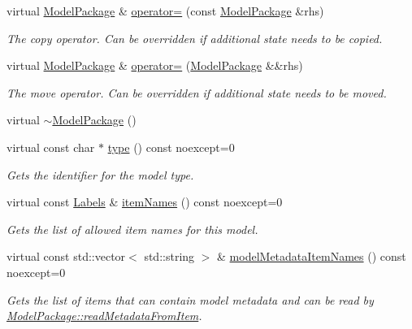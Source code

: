 \begin{DoxyCompactItemize}
\item 
virtual \hyperlink{classdg_1_1deepcore_1_1classification_1_1_model_package}{Model\+Package} \& \hyperlink{group___classification_module_gac73fbbe8aca7bc1f27507c471939a0e7}{operator=} (const \hyperlink{classdg_1_1deepcore_1_1classification_1_1_model_package}{Model\+Package} \&rhs)
\begin{DoxyCompactList}\small\item\em The copy operator. Can be overridden if additional state needs to be copied. \end{DoxyCompactList}\item 
virtual \hyperlink{classdg_1_1deepcore_1_1classification_1_1_model_package}{Model\+Package} \& \hyperlink{group___classification_module_ga20bc12c1bba9457962b58f993a2106b4}{operator=} (\hyperlink{classdg_1_1deepcore_1_1classification_1_1_model_package}{Model\+Package} \&\&rhs)
\begin{DoxyCompactList}\small\item\em The move operator. Can be overridden if additional state needs to be moved. \end{DoxyCompactList}\item 
virtual \hyperlink{classdg_1_1deepcore_1_1classification_1_1_model_package_ad412100a44a69ffab9a37d236d5792ee}{$\sim$\+Model\+Package} ()
\item 
virtual const char $\ast$ \hyperlink{group___classification_module_ga9f09bd24a91c366c473b9fbb9a59b64a}{type} () const noexcept=0
\begin{DoxyCompactList}\small\item\em Gets the identifier for the model type. \end{DoxyCompactList}\item 
virtual const \hyperlink{group___classification_module_ga4c4d47162fed299b627f2e9d17381866}{Labels} \& \hyperlink{group___classification_module_gaa23ae021f838b2836c02dcc626bc1c8e}{item\+Names} () const noexcept=0
\begin{DoxyCompactList}\small\item\em Gets the list of allowed item names for this model. \end{DoxyCompactList}\item 
virtual const std\+::vector$<$ std\+::string $>$ \& \hyperlink{group___classification_module_ga634f0af2484a3c6de2e8c3a2ff6cea1d}{model\+Metadata\+Item\+Names} () const noexcept=0
\begin{DoxyCompactList}\small\item\em Gets the list of items that can contain model metadata and can be read by \hyperlink{group___classification_module_gaa50c6f125db866bddba70b958c6a1074}{Model\+Package\+::read\+Metadata\+From\+Item}. \end{DoxyCompactList}\item 

\end{DoxyCompactItemize}
